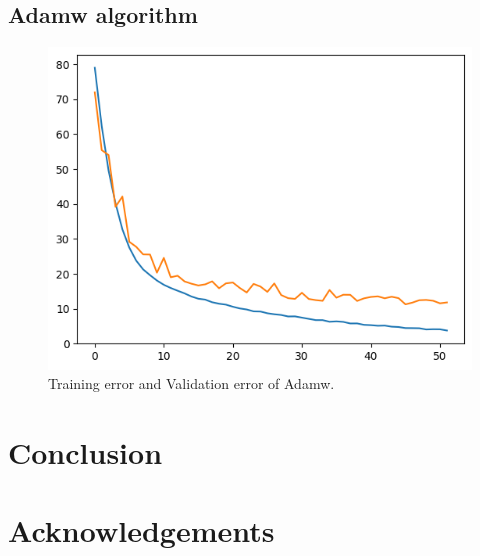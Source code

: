 \section{Adamw algorithm}
\begin{figure}[h]
    \centering %
        \includegraphics[width=0.8\linewidth]{./ADAMW.png} 
    \caption{Training error and Validation error of Adamw.}
    \label{figure:sample figure} %
\end{figure}





\chapter{Conclusion}

\chapter{Acknowledgements}

